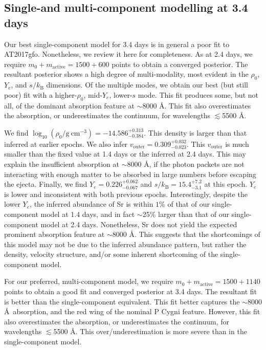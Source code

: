 \documentclass[twocolumn,twocolappendix]{aastex63}
\begin{document}
\subsection{Single-and multi-component modelling at 3.4 days}\label{ssc:3.4}

Our best single-component model for 3.4 days is in general a poor fit to AT2017gfo. Nonetheless, we review it here for completeness. As at 2.4 days, we require $m_0 + m_{\mathrm{active}} = 1500 + 600$ points to obtain a converged posterior. The resultant posterior shows a high degree of multi-modality, most evident in the $\rho_0$, $Y_e$, and $s / k_{\mathrm{B}}$ dimensions. Of the multiple modes, we obtain our best (but still poor) fit with a higher-$\rho_0$, mid-$Y_e$, lower-$s$ mode. This fit produces some, but not all, of the dominant absorption feature at $\sim$8000 \AA. This fit also overestimates the absorption, or underestimates the continuum, for wavelengths $\lesssim$5500 \AA. 

We find $\log_{10} (\rho_0 / \mathrm{g~cm^{-3}}) = -14.586^{+0.313}_{-0.384}$. This density is larger than that inferred at earlier epochs. We also infer $v_{\mathrm{outer}} = 0.309^{+0.032}_{-0.023}$. This $v_{\mathrm{outer}}$ is much smaller than the fixed value at 1.4 days or the inferred at 2.4 days. This may explain the insufficient absorption at $\sim$8000 \AA, if the photon packets are not interacting with enough matter to be absorbed in large numbers before escaping the ejecta. Finally, we find $Y_e = 0.226^{+0.062}_{-0.067}$ and $s/k_{\mathrm{B}} = 15.4^{+7.2}_{-3.1}$ at this epoch. $Y_e$ is lower and inconsistent with both previous epochs. Interestingly, despite the lower $Y_e$, the inferred abundance of Sr is within $1$\% of that of our single-component model at 1.4 days, and in fact $\sim$25\% larger than that of our single-component model at 2.4 days. Nonetheless, Sr does not yield the expected prominent absorption feature at $\sim$8000 \AA. This suggests that the shortcomings of this model may not be due to the inferred abundance pattern, but rather the density, velocity structure, and/or some inherent shortcoming of the single-component model.

For our preferred, multi-component model, we require $m_0 + m_{\mathrm{active}} = 1500 + 1140$ points to obtain a good fit and converged posterior at 3.4 days. The resultant fit is better than the single-component equivalent. This fit better captures the $\sim$8000 \AA~absorption, and the red wing of the nominal P Cygni feature. However, this fit also overestimates the absorption, or underestimates the continuum, for wavelengths $\lesssim$5500 \AA. This over/underestimation is more severe than in the single-component model.
\end{document}
